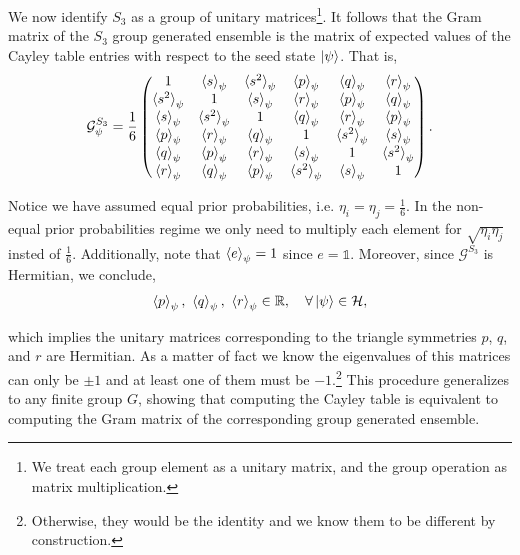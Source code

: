 \documentclass[12pt,letterpaper]{article}
\begin{document}
We now identify $S_3$ as a group of unitary matrices\footnote{We treat each group element as a unitary matrix, and the group operation as matrix multiplication.}. It follows that the Gram matrix of the $S_3$ group generated ensemble is the matrix of expected values of the Cayley table entries with respect to the seed state $\ket{\psi}$. That is,
\begin{align*}
	\mathcal{G}^{S_3}_{\psi} = \frac{1}{6}\begin{pmatrix}
        1 & \braket{s}_\psi & \braket{s^2}_\psi & \braket{p}_\psi & \braket{q}_\psi & \braket{r}_\psi \\ 
        \braket{s^2}_\psi & 1 & \braket{s}_\psi & \braket{r}_\psi & \braket{p}_\psi & \braket{q}_\psi \\
        \braket{s}_\psi & \braket{s^2}_\psi & 1 & \braket{q}_\psi & \braket{r}_\psi & \braket{p}_\psi \\
        \braket{p}_\psi & \braket{r}_\psi & \braket{q}_\psi & 1 & \braket{s^2}_\psi & \braket{s}_\psi \\
        \braket{q}_\psi & \braket{p}_\psi & \braket{r}_\psi & \braket{s}_\psi & 1 & \braket{s^2}_\psi \\
        \braket{r}_\psi & \braket{q}_\psi & \braket{p}_\psi & \braket{s^2}_\psi & \braket{s}_\psi & 1
	\end{pmatrix}.
\end{align*}

Notice we have assumed equal prior probabilities, i.e. $\eta_i = \eta_j = \frac{1}{6}$. In the non-equal prior probabilities regime we only need to multiply each element for $\sqrt{\eta_i\eta_j}$ insted of $\frac{1}{6}$. Additionally, note that $\braket{e}_\psi = 1$ since $e = \mathds{1}$. Moreover, since $\mathcal{G}^{S_3}$ is Hermitian, we conclude,
\begin{align*}
\braket{p}_{\psi},\ \braket{q}_{\psi},\ \braket{r}_{\psi} \in \mathbb{R}, \quad \forall \ket{\psi} \in \mathcal{H},
\end{align*}

which implies the unitary matrices corresponding to the triangle symmetries $p$, $q$, and $r$ are Hermitian. As a matter of fact we know the eigenvalues of this matrices can only be $\pm 1$ and at least one of them must be $-1$.\footnote{Otherwise, they would be the identity and we know them to be different by construction.} This procedure generalizes to any finite group $G$, showing that computing the Cayley table is equivalent to computing the Gram matrix of the corresponding group generated ensemble.
\end{document}
